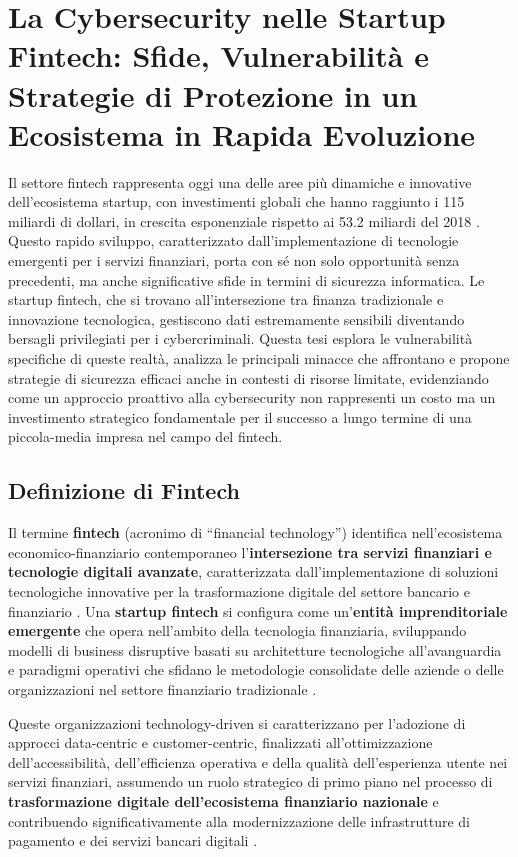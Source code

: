 
\section{La Cybersecurity nelle Startup Fintech: Sfide, Vulnerabilità e Strategie di Protezione in un Ecosistema in Rapida Evoluzione}

Il settore fintech rappresenta oggi una delle aree più dinamiche e innovative dell'ecosistema startup, con investimenti globali che hanno raggiunto i 115 miliardi di dollari, in crescita esponenziale rispetto ai 53.2 miliardi del 2018 \cite{gartnerFintech}. Questo rapido sviluppo, caratterizzato dall'implementazione di tecnologie emergenti per i servizi finanziari, porta con sé non solo opportunità senza precedenti, ma anche significative sfide in termini di sicurezza informatica. Le startup fintech, che si trovano all'intersezione tra finanza tradizionale e innovazione tecnologica, gestiscono dati estremamente sensibili diventando bersagli privilegiati per i cybercriminali. Questa tesi esplora le vulnerabilità specifiche di queste realtà, analizza le principali minacce che affrontano e propone strategie di sicurezza efficaci anche in contesti di risorse limitate, evidenziando come un approccio proattivo alla cybersecurity non rappresenti un costo ma un investimento strategico fondamentale per il successo a lungo termine di una piccola-media impresa nel campo del fintech.
\subsection{Definizione di Fintech}

Il termine \textbf{fintech} (acronimo di ``financial technology'') identifica nell'ecosistema economico-finanziario contemporaneo l'\textbf{intersezione tra servizi finanziari e tecnologie digitali avanzate}, caratterizzata dall'implementazione di soluzioni tecnologiche innovative per la trasformazione digitale del settore bancario e finanziario \cite{tecnofinanza}. Una \textbf{startup fintech} si configura come un'\textbf{entità imprenditoriale emergente} che opera nell'ambito della tecnologia finanziaria, sviluppando modelli di business disruptive basati su architetture tecnologiche all'avanguardia e paradigmi operativi che sfidano le metodologie consolidate delle aziende o delle organizzazioni nel settore finanziario tradizionale \cite{fintech_numeri}.

Queste organizzazioni technology-driven si caratterizzano per l'adozione di approcci data-centric e customer-centric, finalizzati all'ottimizzazione dell'accessibilità, dell'efficienza operativa e della qualità dell'esperienza utente nei servizi finanziari, assumendo un ruolo strategico di primo piano nel processo di \textbf{trasformazione digitale dell'ecosistema finanziario nazionale} e contribuendo significativamente alla modernizzazione delle infrastrutture di pagamento e dei servizi bancari digitali \cite{tecnofinanza}.

